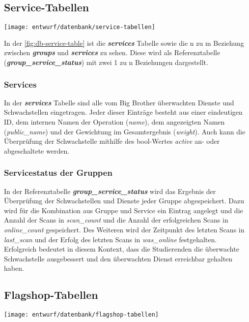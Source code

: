 \subsection{Service-Tabellen}
\begin{center}
	\texttt{[image: entwurf/datenbank/service-tabellen]}
	\label{fig:db-service-table}
\end{center}


In der \autoref{fig:db-service-table} ist die \textbf{\textit{services}} Tabelle sowie die n zu m Beziehung zwischen \textbf{\textit{groups}} und \textbf{\textit{services}} zu sehen. Diese wird als Referenztabelle (\textbf{\textit{group\_service\_status}}) mit zwei 1 zu n Beziehungen dargestellt.

\subsubsection{Services}
In der \textbf{\textit{services}} Tabelle sind alle vom Big Brother überwachten Dienste und Schwachstellen eingetragen. Jeder dieser Einträge besteht aus einer eindeutigen ID, dem internen Namen der Operation (\textit{name}), dem angezeigten Namen (\textit{public\_name}) und der Gewichtung im Gesamtergebnis (\textit{weight}). Auch kann die Überprüfung der Schwachstelle mithilfe des bool-Wertes \textit{active} an- oder abgeschaltete werden.

\subsubsection{Servicestatus der Gruppen}
In der Referenztabelle \textbf{\textit{group\_service\_status}} wird das Ergebnis der Überprüfung der Schwachstellen und Dienste jeder Gruppe abgespeichert. Dazu wird für die Kombination aus Gruppe und Service ein Eintrag angelegt und die Anzahl der Scans in \textit{scan\_count} und die Anzahl der erfolgreichen Scans in \textit{online\_count} gespeichert. Des Weiteren wird der Zeitpunkt des letzten Scans in \textit{last\_scan} und der Erfolg des letzten Scans in \textit{was\_online} festgehalten. Erfolgreich bedeutet in diesem Kontext, dass die Studierenden die überwachte Schwachstelle ausgebessert und den überwachten Dienst erreichbar gehalten haben.

\subsection{Flagshop-Tabellen}
\begin{center}
	\texttt{[image: entwurf/datenbank/flagshop-tabellen]}
	\label{fig:db-flagshop-table}
\end{center}

